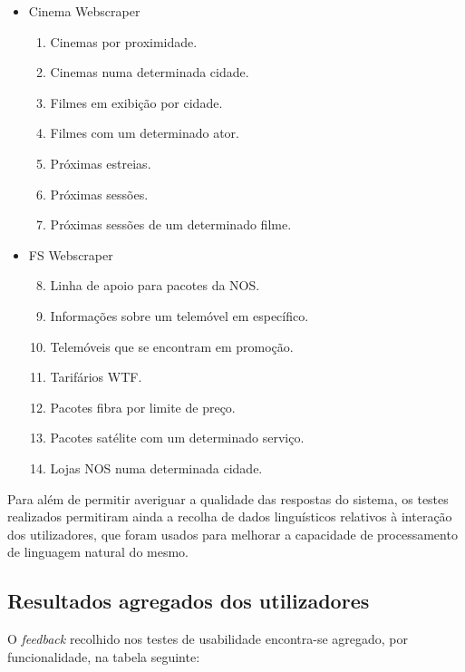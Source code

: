 \documentclass[11pt, a4paper]{article}
\begin{document}
\begin{itemize}
    \item Cinema Webscraper
        \begin{enumerate}
            \item Cinemas por proximidade.
            \item Cinemas numa determinada cidade.
            \item Filmes em exibição por cidade.
            \item Filmes com um determinado ator.
            \item Próximas estreias.
            \item Próximas sessões.
            \item Próximas sessões de um determinado filme.
        \end{enumerate}
    \item FS Webscraper
        \begin{enumerate}
            \setcounter{enumi}{7}
            \item Linha de apoio para pacotes da NOS.
            \item Informações sobre um telemóvel em específico.
            \item Telemóveis que se encontram em promoção.
            \item Tarifários WTF.
            \item Pacotes fibra por limite de preço.
            \item Pacotes satélite com um determinado serviço.
            \item Lojas NOS numa determinada cidade.
        \end{enumerate}
\end{itemize}

Para além de permitir averiguar a qualidade das respostas do sistema, os testes realizados permitiram
ainda a recolha de dados linguísticos relativos à interação dos utilizadores, que foram usados para melhorar
a capacidade de processamento de linguagem natural do mesmo.

\subsection{Resultados agregados dos utilizadores}

O \textit{feedback} recolhido nos testes de usabilidade encontra-se agregado, por funcionalidade, na tabela
seguinte:
\end{document}
